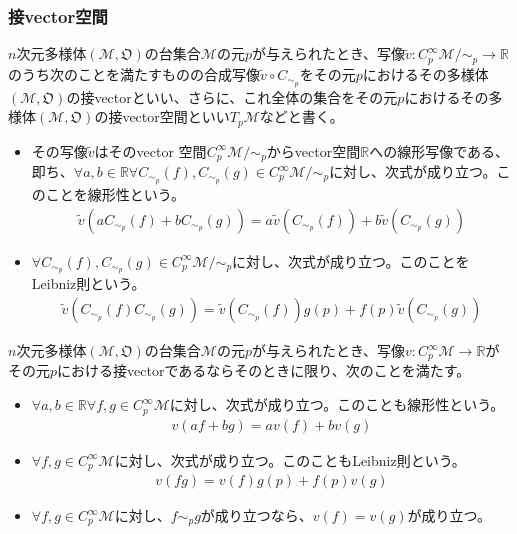\documentclass[dvipdfmx]{jsarticle}
\begin{document}
\subsubsection{接vector空間}
\begin{axs}[接vector空間の公理]
  $n$次元多様体$\left(\mathcal{M},\mathfrak{O}\right)$の台集合$\mathcal{M}$の元$p$が与えられたとき、写像$\widetilde{v}:C^\infty_p \mathcal{M}/\sim_p \rightarrow \mathbb{R}$のうち次のことを満たすものの合成写像$\widetilde{v} \circ C_{\sim_p}$をその元$p$におけるその多様体$\left( \mathcal{M},\mathfrak{O} \right) $の接vectorといい、さらに、これ全体の集合をその元$p$におけるその多様体$\left( \mathcal{M},\mathfrak{O} \right) $の接vector空間といい$T_p \mathcal{M} $などと書く。
  \begin{itemize}
    \item その写像$\widetilde{v}$はそのvector 空間$C^\infty_p \mathcal{M}/\sim_p $からvector空間$\mathbb{R}$への線形写像である、即ち、$\forall a,b\in \mathbb{R} \forall C_{\sim_p}\left(f\right),C_{\sim_p}\left(g\right)\in C^\infty_p \mathcal{M}/\sim_p $に対し、次式が成り立つ。このことを線形性という。
    \begin{align*}
      \widetilde{v}\left( aC_{\sim_p}\left(f\right)+bC_{\sim_p}\left(g\right)\right) =a\widetilde{v}\left(C_{\sim_p}\left(f\right)\right) +b\widetilde{v}\left(C_{\sim_p}\left(g\right)\right) 
    \end{align*}
    \item $\forall C_{\sim_p} \left(f\right),C_{\sim_p} \left(g\right)\in C^\infty_p \mathcal{M}/\sim_p $に対し、次式が成り立つ。このことをLeibniz則という。
    \begin{align*}
      \widetilde{v}\left( C_{\sim_p}\left(f\right)C_{\sim_p}\left(g\right)\right) =\widetilde{v}\left(C_{\sim_p}\left(f\right)\right) g\left( p\right) +f\left( p\right) \widetilde{v}\left(C_{\sim_p}\left(g\right)\right) 
    \end{align*}
  \end{itemize}
\end{axs}
\begin{thm}\label{8.3.3.6}
  $n$次元多様体$\left(\mathcal{M},\mathfrak{O}\right)$の台集合$\mathcal{M}$の元$p$が与えられたとき、写像$v:C^\infty_p \mathcal{M}\rightarrow \mathbb{R}$がその元$p$における接vectorであるならそのときに限り、次のことを満たす。
  \begin{itemize}
    \item $\forall a,b\in \mathbb{R} \forall f,g\in C^\infty_p \mathcal{M}$に対し、次式が成り立つ。このことも線形性という。
    \begin{align*}
      v\left( af+bg\right) =av\left(f\right) +bv\left(g\right) 
    \end{align*}
    \item $\forall f,g\in C^\infty_p \mathcal{M}$に対し、次式が成り立つ。このこともLeibniz則という。
    \begin{align*}
      v\left(fg\right)=v\left(f\right)g\left( p\right)+f\left(p\right)v\left(g\right) 
    \end{align*}
    \item $\forall f,g \in C^\infty_p \mathcal{M}$に対し、$f\sim_p g$が成り立つなら、$v\left(f\right) =v\left(g\right)$が成り立つ。
  \end{itemize}
\end{thm}
\end{document}
